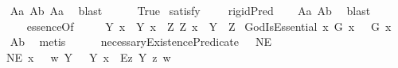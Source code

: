 \begin{isabellebody}
\ %
%
\isamarkupfalse%
\ A{}a\ A{}b\ A{}a\ \isamarkupfalse%
\ blast%
%
%
\isanewline
\ \ \ \ \isanewline
{}\isamarkupfalse%
\ True\ \isamarkupfalse%
{\isacharbrackleft}satisfy{\isacharbrackright}%
\ %
%
\isamarkupfalse%
\ %
%
%
%
\isanewline
{}\isamarkupfalse%
\ {\isachardoublequoteopen}{\isasymlfloor}rigidPred\ {\isasymP}{\isasymrfloor}{\isachardoublequoteclose}%
\ %
%
\isamarkupfalse%
\ A{}a\ A{}b\ \isamarkupfalse%
\ blast\ %
%
%
%
\isanewline
\ \ \ \ \isanewline
{}\isamarkupfalse%
\ essenceOf{\isacharcolon}{\isacharcolon}{\isachardoublequoteopen}{\isasymup}{\isasymlangle}{\isasymlangle}{\isasymzero}{\isasymrangle}{\isacharcomma}{\isasymzero}{\isasymrangle}{\isachardoublequoteclose}\ {\isacharparenleft}{\isachardoublequoteopen}{\isasymE}{\isachardoublequoteclose}{\isacharparenright}\ \isanewline
\ \ {\isachardoublequoteopen}{\isasymE}\ Y\ x\ {\isasymequiv}\ {\isasymlparr}Y\ x{\isasymrparr}\ \isactrlbold {\isasymand}\ {\isacharparenleft}\isactrlbold {\isasymforall}Z{\isacharcolon}{\isacharcolon}{\isasymlangle}{\isasymzero}{\isasymrangle}{\isachardot}\ {\isasymlparr}Z\ x{\isasymrparr}\ \isactrlbold {\isasymrightarrow}\ Y\ {\isasymRrightarrow}\ Z{\isacharparenright}{\isachardoublequoteclose}\isanewline
{}\isamarkupfalse%
\ GodIsEssential{\isacharcolon}\ {\isachardoublequoteopen}{\isasymlfloor}\isactrlbold {\isasymforall}x{\isachardot}\ G\ x\ \isactrlbold {\isasymrightarrow}\ {\isacharparenleft}{\isacharparenleft}{\isasymE}\ {\isasymdown}G{\isacharparenright}\ x{\isacharparenright}{\isasymrfloor}{\isachardoublequoteclose}%
\ %
%
\isamarkupfalse%
\ A{}b\ \isamarkupfalse%
\ metis%
%
%
\isanewline
\ \ \ \ \isanewline
{}\isamarkupfalse%
\ necessaryExistencePredicate\ {\isacharcolon}{\isacharcolon}\ {\isachardoublequoteopen}{\isasymup}{\isasymlangle}{\isasymzero}{\isasymrangle}{\isachardoublequoteclose}\ {\isacharparenleft}{\isachardoublequoteopen}NE{\isachardoublequoteclose}{\isacharparenright}\ \isanewline
\ \ {\isachardoublequoteopen}NE\ x\ \ {\isasymequiv}\ {\isasymlambda}w{\isachardot}\ {\isacharparenleft}\isactrlbold {\isasymforall}Y{\isachardot}\ \ {\isasymE}\ Y\ x\ \isactrlbold {\isasymrightarrow}\ \isactrlbold {\isasymbox}{\isacharparenleft}\isactrlbold {\isasymexists}\isactrlsup Ez{\isachardot}\ {\isasymlparr}Y\ z{\isasymrparr}{\isacharparenright}{\isacharparenright}\ w{\isachardoublequoteclose}\isanewline

\end{isabellebody}
